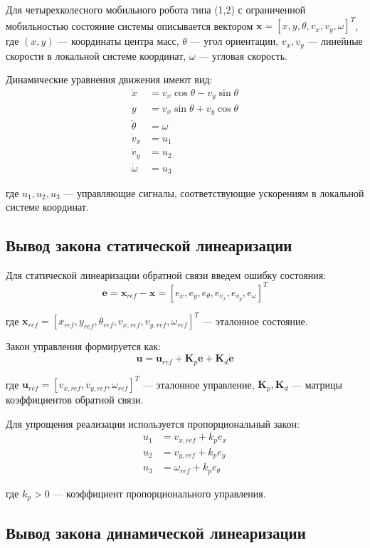 Для четырехколесного мобильного робота типа (1,2) с ограниченной мобильностью состояние системы описывается вектором $\mathbf{x} = [x, y, \theta, v_x, v_y, \omega]^T$, где $(x, y)$ --- координаты центра масс, $\theta$ --- угол ориентации, $v_x, v_y$ --- линейные скорости в локальной системе координат, $\omega$ --- угловая скорость.

Динамические уравнения движения имеют вид:
\begin{align}
\dot{x} &= v_x \cos\theta - v_y \sin\theta \\
\dot{y} &= v_x \sin\theta + v_y \cos\theta \\
\dot{\theta} &= \omega \\
\dot{v}_x &= u_1 \\
\dot{v}_y &= u_2 \\
\dot{\omega} &= u_3
\end{align}

где $u_1, u_2, u_3$ --- управляющие сигналы, соответствующие ускорениям в локальной системе координат.

\subsection{Вывод закона статической линеаризации}

Для статической линеаризации обратной связи введем ошибку состояния:
$$\mathbf{e} = \mathbf{x}_{ref} - \mathbf{x} = [e_x, e_y, e_\theta, e_{v_x}, e_{v_y}, e_\omega]^T$$

где $\mathbf{x}_{ref} = [x_{ref}, y_{ref}, \theta_{ref}, v_{x,ref}, v_{y,ref}, \omega_{ref}]^T$ --- эталонное состояние.

Закон управления формируется как:
$$\mathbf{u} = \mathbf{u}_{ref} + \mathbf{K}_p \mathbf{e} + \mathbf{K}_d \dot{\mathbf{e}}$$

где $\mathbf{u}_{ref} = [v_{x,ref}, v_{y,ref}, \omega_{ref}]^T$ --- эталонное управление, $\mathbf{K}_p, \mathbf{K}_d$ --- матрицы коэффициентов обратной связи.

Для упрощения реализации используется пропорциональный закон:
\begin{align}
u_1 &= v_{x,ref} + k_p e_x \\
u_2 &= v_{y,ref} + k_p e_y \\
u_3 &= \omega_{ref} + k_p e_\theta
\end{align}

где $k_p > 0$ --- коэффициент пропорционального управления.

\subsection{Вывод закона динамической линеаризации}

